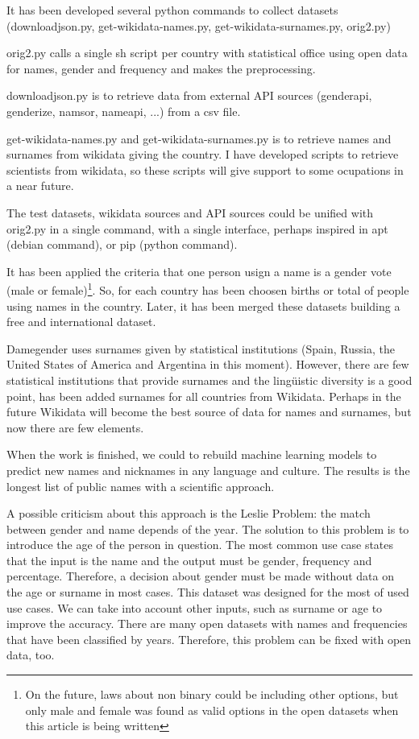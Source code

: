\documentclass[a4paper]{article}
\begin{document}
It has been developed several python commands to collect datasets
(downloadjson.py, get-wikidata-names.py, get-wikidata-surnames.py,
orig2.py)

orig2.py calls a single sh script per country with statistical office
using open data for names, gender and frequency and makes the preprocessing.

downloadjson.py is to retrieve data from external API sources (genderapi,
genderize, namsor, nameapi, ...) from a csv file.

get-wikidata-names.py and get-wikidata-surnames.py is to retrieve names
and surnames from wikidata giving the country. I have developed scripts
to retrieve scientists from wikidata, so these scripts will give support to
some ocupations in a near future.

The test datasets, wikidata sources and API sources could be unified
with orig2.py in a single command, with a single interface,
perhaps inspired in apt (debian command), or pip (python command).

It has been applied the criteria that one person usign a name is
a gender vote (male or female)\footnote{On the future, laws about
non binary could be including other options, but only male and
female was found as valid options in the open datasets when this
article is being written}. So, for each country has been choosen
births or total of people using names in the country. Later, it
has been merged these datasets building a free and international
dataset. 

Damegender uses surnames given by statistical institutions (Spain,
Russia, the United States of America and Argentina in this moment).
However, there are few statistical institutions that provide
surnames and the lingüistic diversity is a good point, has been
added surnames for all countries from Wikidata. Perhaps in the future
Wikidata will become the best source of data for names and surnames,
but now there are few elements.

When the work is finished, we could to rebuild machine learning models
to predict new names and nicknames in any language and culture. The
results is the longest list of public names with a scientific approach.

A possible criticism about this approach is the Leslie
Problem\cite{blevins2015jane}: the match between gender and name
depends of the year. The solution to this problem is to introduce the
age of the person in question. The most common use case states that
the input is the name and the output must be gender, frequency and
percentage. Therefore, a decision about gender must be made without
data on the age or surname in most cases. This dataset was designed for
the most of used use cases. We can take into account other inputs,
such as surname or age to improve the accuracy. There are many open
datasets with names and frequencies that have been classified by years.
Therefore, this problem can be fixed with open data, too.
\end{document}
